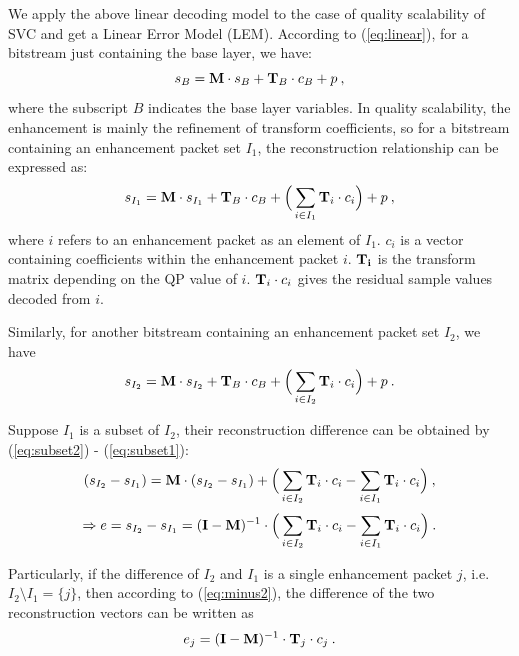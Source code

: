 \documentclass[journal]{IEEEtran}
\begin{document}
We apply the above linear decoding model to the case of quality scalability of SVC and get a Linear Error Model (LEM). According to (\ref{eq:linear}), for a bitstream just containing the base layer, we have:
\begin{equation}
\label{eq:base0}
s_{B} = {\rm\bf M} \cdot s_{B} + {\rm\bf T}_{B} \cdot c_{B} + p \: ,
\end{equation}
where the subscript $B$ indicates the base layer variables. In quality scalability, the enhancement is mainly the refinement of transform coefficients, so for a bitstream containing an enhancement packet set $I_1$, the reconstruction relationship can be expressed as:
\begin{equation}
\label{eq:subset1}
s_{I_1} = {\rm\bf M} \cdot s_{I_1} + {\rm\bf T}_{B} \cdot c_{B} + \Big( \sum_{i \in I_1}{\rm\bf T}_i \cdot c_i \Big) + p \: ,
\end{equation}
where $i$ refers to an enhancement packet as an element of $I_1$. $c_i$ is a vector containing coefficients within the enhancement packet $i$. ${\rm\bf T_i}$ is the transform matrix depending on the QP value of $i$. ${\rm\bf T}_i \cdot c_i$ gives the residual sample values decoded from $i$.

Similarly, for another bitstream containing an enhancement packet set $I_2$, we have
\begin{equation}
\label{eq:subset2}
s_{I_2} = {\rm\bf M} \cdot s_{I_2} + {\rm\bf T}_{B} \cdot c_{B} + \Big( \sum_{i \in I_2}{\rm\bf T}_i \cdot c_i \Big) + p \: .
\end{equation}

Suppose $I_1$ is a subset of $I_2$, their reconstruction difference can be obtained by (\ref{eq:subset2}) - (\ref{eq:subset1}):
\begin{equation}
\label{eq:minus1}
(s_{I_2} - s_{I_1}) = {\rm\bf M} \cdot (s_{I_2} - s_{I_1}) + \Big( \sum_{i \in I_2}{\rm\bf T}_i \cdot c_i - \sum_{i \in I_1}{\rm\bf T}_i \cdot c_i \Big) \: ,
\end{equation}
\begin{equation}
\label{eq:minus2}
\Rightarrow e = s_{I_2} - s_{I_1} = ({\rm\bf I - M})^{-1} \cdot \Big( \sum_{i \in I_2}{\rm\bf T}_i \cdot c_i - \sum_{i \in I_1}{\rm\bf T}_i \cdot c_i \Big) \: .
\end{equation}
	
Particularly, if the difference of $I_2$ and $I_1$ is a single enhancement packet $j$, i.e. $I_2 \setminus I_1 = \{j\}$, then according to (\ref{eq:minus2}), the difference of the two reconstruction vectors can be written as
\begin{equation}
\label{eq:error_j}
e_j = ({\rm\bf I - M})^{-1} \cdot {\rm\bf T}_j \cdot c_j \: .
\end{equation}
	
\end{document}

